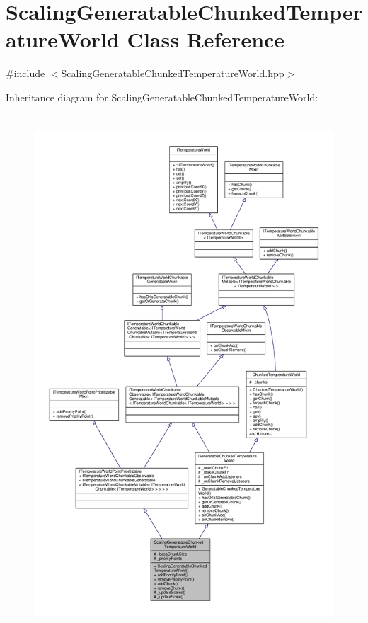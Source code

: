\hypertarget{class_scaling_generatable_chunked_temperature_world}{\section{Scaling\-Generatable\-Chunked\-Temperature\-World Class Reference}
\label{class_scaling_generatable_chunked_temperature_world}
}


{\ttfamily \#include $<$Scaling\-Generatable\-Chunked\-Temperature\-World.\-hpp$>$}



Inheritance diagram for Scaling\-Generatable\-Chunked\-Temperature\-World\-:
\nopagebreak
\begin{figure}[H]
\begin{center}
\leavevmode
\includegraphics[height=550pt]{class_scaling_generatable_chunked_temperature_world__inherit__graph}
\end{center}
\end{figure}


